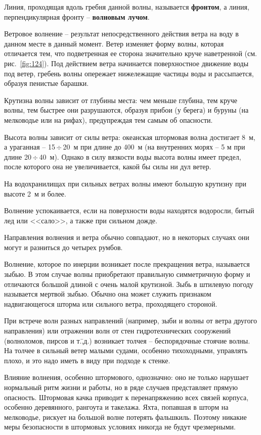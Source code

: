 \documentclass[a4paper, 12pt, twoside, final, book, russian, fittopage, cyremdash]{ncc}
\newcommand{\otdo}{\,\ensuremath{\div}\,}
\newcommand{\ris}[1]{\ref{fig:#1}}
\begin{document}
Линия, проходящая вдоль гребня данной волны, называется \textbf{фронтом}, а линия, перпендикулярная фронту \--- \textbf{волновым лучом}.

Ветровое волнение \--- результат непосредственного действия ветра на воду в данном месте в данный момент. Ветер изменяет форму волны, которая отличается тем, что подветренная ее сторона значительно круче наветренной (см. рис.~\ris{124}). Под действием ветра начинается поверхностное движение воды под ветер, гребень волны опережает нижележащие частицы воды и рассыпается, образуя пенистые барашки.

Крутизна волны зависит от глубины места: чем меньше глубина, тем круче волны, тем быстрее они разрушаются, образуя прибои (у берега) и буруны (на мелководье или на рифах), предупреждая тем самым об опасности.

Высота волны зависит от силы ветра: океанская штормовая волна достигает 8~м, а ураганная \--- 15\otdo 20~м при длине до 400~м (на внутренних морях \--- 5 м при длине 20\otdo 40~м). Однако в силу вязкости воды высота волны имеет предел, после которого она не увеличивается, какой бы силы ни дул ветер.

На водохранилищах при сильных ветрах волны имеют большую крутизну при высоте 2~м и более.

Волнение успокаивается, если на поверхности воды находятся водоросли, битый лед или <<сало>>, а также при сильном дожде.

Направления волнения и ветра обычно совпадают, но в некоторых случаях они могут и разниться до четырех румбов.

Волнение, которое по инерции возникает после прекращения ветра, называется зыбью. В этом случае волны приобретают правильную симметричную форму и отличаются большой длиной с очень малой крутизной. Зыбь в штилевую погоду называется мертвой зыбью. Обычно она может служить признаком надвигающегося шторма или сильного ветра, проходящего стороной.

При встрече волн разных направлений (например, зыби и волны от ветра другого направления) или отражении волн от стен гидротехнических сооружений (волноломов, пирсов и т.\=,д.) возникает толчея \--- беспорядочные стоячие волны. На толчее в сильный ветер малыми судами, особенно тихоходными, управлять плохо, и это надо иметь в виду при подходе к стенке.

Влияние волнения, особенно штормового, однозначно: оно не только нарушает нормальный ритм жизни и работы, но в ряде случаев представляет прямую опасность. Штормовая качка приводит к перенапряжению всех связей корпуса, особенно деревянного, рангоута и такелажа. Яхта, попавшая в шторм на мелководье, рискует на большой волне потерять фальшкиль. Поэтому никакие меры безопасности в штормовых условиях никогда не будут чрезмерными.
\end{document}
